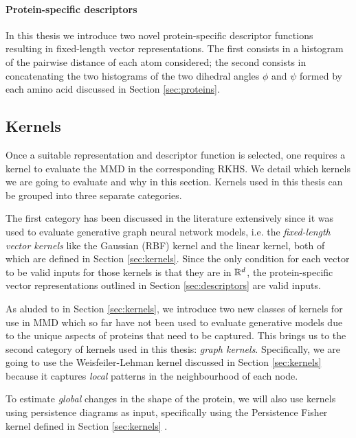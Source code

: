 \paragraph{Protein-specific descriptors} In this thesis we introduce
two novel protein-specific descriptor functions resulting in fixed-length vector
representations. The first consists in a histogram of the pairwise distance of
each atom considered; the second consists in concatenating the two histograms of
the two dihedral angles $\phi$ and $\psi$ formed by each amino acid discussed in Section
\ref{sec:proteins}.


\subsection{Kernels}
Once a suitable representation and descriptor function is selected, one requires
a kernel to evaluate the MMD in the corresponding RKHS. We detail which kernels
we are going to evaluate and why in this section. Kernels used in this thesis can be grouped into
three separate categories.

The first category has been discussed in the literature extensively since it was
used to evaluate generative graph neural network models, i.e. the
\emph{fixed-length vector kernels} like the Gaussian (RBF) kernel and the linear
kernel, both of which are defined in Section \ref{sec:kernels}. Since the only
condition for each vector to be valid inputs for those kernels is that they are
in $\mathbb{R}^d$, the protein-specific vector representations outlined in Section
\ref{sec:descriptors} are valid inputs.

As aluded to in Section \ref{sec:kernels}, we introduce two new classes of
kernels for use in MMD which so far have not been used to evaluate generative
models due to the unique aspects of proteins that need to be captured. This
brings us to the second category of kernels used in this thesis: \emph{graph kernels}.
Specifically, we are going to use the Weisfeiler-Lehman kernel discussed in
Section \ref{sec:kernels} because it captures \emph{local} patterns in the
neighbourhood of each node.

To estimate \emph{global} changes in the shape of the protein, we will also use
kernels using persistence diagrams as input, specifically using the Persistence
Fisher kernel defined in Section \ref{sec:kernels} \citep{le2018persistence}.

